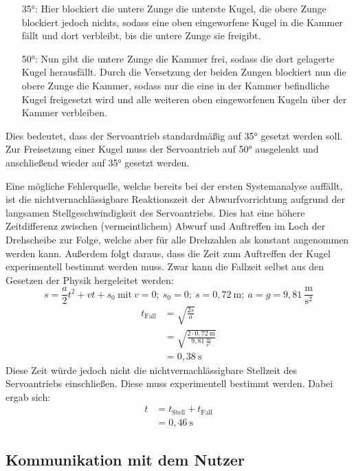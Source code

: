 \documentclass{kis}
\begin{document}
\begin{itemize}
\item[35°:] Hier blockiert die untere Zunge die unterste Kugel, die obere Zunge blockiert jedoch nichts, sodass eine oben eingeworfene Kugel in die Kammer fällt und dort verbleibt, bis die untere Zunge sie freigibt.
\item[50°:] Nun gibt die untere Zunge die Kammer frei, sodass die dort gelagerte Kugel herausfällt. Durch die Versetzung der beiden Zungen blockiert nun die obere Zunge die Kammer, sodass nur die eine in der Kammer befindliche Kugel freigesetzt wird und alle weiteren oben eingeworfenen Kugeln über der Kammer verbleiben.
\end{itemize}

Dies bedeutet, dass der Servoantrieb standardmäßig auf 35° gesetzt werden soll. Zur Freisetzung einer Kugel muss der Servoantrieb auf 50° ausgelenkt und anschließend wieder auf 35° gesetzt werden.

Eine mögliche Fehlerquelle, welche bereits bei der ersten Systemanalyse auffällt, ist die nichtvernachlässigbare Reaktionszeit der Abwurfvorrichtung aufgrund der langsamen Stellgeschwindigkeit des Servoantriebs. Dies hat eine höhere Zeitdifferenz zwischen (vermeintlichem) Abwurf und Auftreffen im Loch der Drehscheibe zur Folge, welche aber für alle Drehzahlen als konstant angenommen werden kann. Außerdem folgt daraus, dass die Zeit zum Auftreffen der Kugel experimentell bestimmt werden muss. Zwar kann die Fallzeit selbst aus den Gesetzen der Physik hergeleitet werden:
$$s = \frac a2t^2+vt+s_0~\text{mit}~v=0;~ s_0=0;~ s=0,72~\text{m};~ a=g=9,81~\frac{\text{m}}{\text{s}^2}$$
\begin{align*}t_\text{Fall} &= \sqrt{\frac{2s}{a}}\\
&= \sqrt{\frac{2\cdot0,72~\text{m}}{9,81~\frac{\text{m}}{\text{s}^2}}}\\
&= 0,38~\text{s}\end{align*}
Diese Zeit würde jedoch nicht die nichtvernachlässigbare Stellzeit des Servoantriebs einschließen. Diese muss experimentell bestimmt werden. Dabei ergab sich:
\begin{align*}t &= t_\text{Stell} + t_\text{Fall}\\
&= 0,46~\text{s}\end{align*}

\subsection{Kommunikation mit dem Nutzer}
\end{document}
